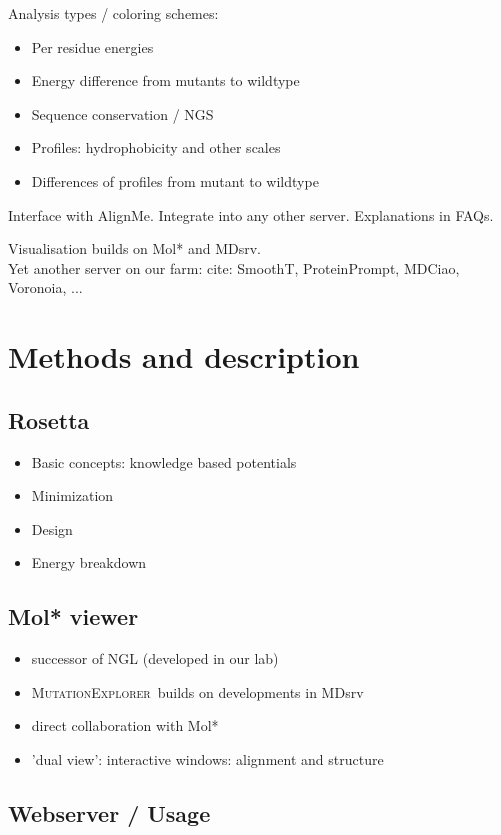 \documentclass[11pt]{article}
\newcommand{\ME}{\textsc{MutationExplorer}}
\begin{document}
\noindent
Analysis types / coloring schemes:
\begin{itemize}
\item Per residue energies
\item Energy difference from mutants to wildtype
\item Sequence conservation / NGS
\item Profiles: hydrophobicity and other scales
\item Differences of profiles from mutant to wildtype
\end{itemize}


\noindent
Interface with AlignMe.
Integrate into any other server. 
Explanations in FAQs.

\noindent
Visualisation builds on Mol* and MDsrv. \\
Yet another server on our farm: cite: SmoothT, ProteinPrompt, MDCiao, Voronoia, ...

\section*{Methods and description}

\subsection*{Rosetta}


\begin{itemize}
\item Basic concepts: knowledge based potentials
\item Minimization
\item Design
\item Energy breakdown
\end{itemize}

\subsection*{Mol* viewer}

\begin{itemize}
\item successor of NGL (developed in our lab)
\item \ME ~builds on developments in MDsrv
\item direct collaboration with Mol*
\item 'dual view': interactive windows: alignment and structure
\end{itemize}

\subsection*{Webserver / Usage}
\end{document}
